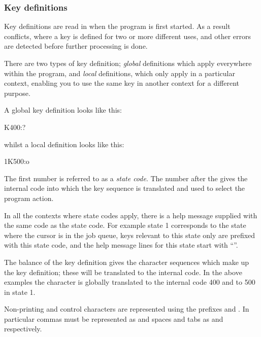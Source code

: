 \subsubsection{Key definitions}
Key definitions are read in when the program is first started. As a result conflicts, where a key is defined for two or more different
uses, and other errors are detected before further processing is done.

There are two types of key definition; \textit{global} definitions which apply everywhere within the program, and \textit{local} definitions,
which only apply in a particular context, enabling you to use the same key in another context for a different purpose.

A global key definition looks like this:

\begin{expara}

K400:?

\end{expara}

whilst a local definition looks like this:

\begin{expara}

1K500:o

\end{expara}

The first number is referred to as a \textit{state code}. The number after the  gives the internal code into which
the key sequence is translated and used to select the program action.

In all the contexts where state codes apply, there is a help message supplied with the same code as the state code. For example state 1
corresponds to the state where the cursor is in the job queue, keys relevant to this state only are prefixed with this state code, and the
help message lines for this state start with ``''.

The balance of the key definition gives the character sequences which make up the key definition; these will be translated to the internal
code. In the above examples the character  is globally translated to the internal code 400 and
 to 500 in state 1.

Non-printing and control characters are represented using the prefixes \exampletext{{\textbackslash}} and
\exampletext{\^{}}. In particular commas must be represented as \exampletext{{\textbackslash},} and spaces and tabs as
 and  respectively.

